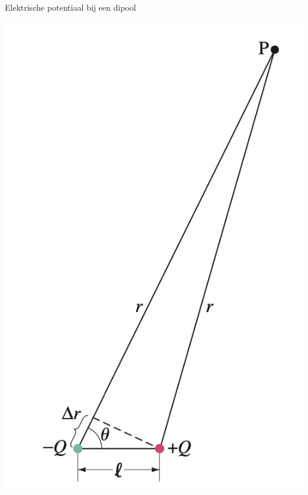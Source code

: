 \begin{app}{Elektrische potentiaal bij een dipool}
\begin{minipage}{.68 \textwidth}
    \end{minipage} 
    \begin{minipage}{.28\textwidth}
        \vspace{-0.3cm}
        \begin{center}
            \includegraphics[scale = 0.4]{Images/Elektriciteit/DipoolPotentiaal.png}
        \end{center}
    \end{minipage}

    
\end{app}

